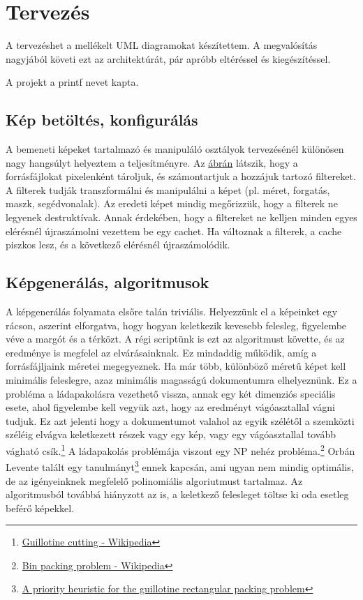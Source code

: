 \chapter{Tervezés}

A tervezéshet a mellékelt UML diagramokat készítettem. A megvalósítás nagyjából követi ezt az architektúrát, pár apróbb eltéréssel és kiegészítéssel.

A projekt a printf nevet kapta.

\section{Kép betöltés, konfigurálás}

A bemeneti képeket tartalmazó és manipuláló osztályok tervezésénél különösen nagy hangsúlyt helyeztem a teljesítményre. Az \href{fig:ImageSource_uml}{ábrán} látszik, hogy a forrásfájlokat pixelenként tároljuk, és számontartjuk a hozzájuk tartozó filtereket. A filterek tudják transzformálni és manipulálni a képet (pl. méret, forgatás, maszk, segédvonalak). Az eredeti képet mindig megőrizzük, hogy a filterek ne legyenek destruktívak. Annak érdekében, hogy a filtereket ne kelljen minden egyes elérésnél újraszámolni vezettem be egy cachet. Ha változnak a filterek, a cache piszkos lesz, és a következő elérésnél újraszámolódik.

\section{Képgenerálás, algoritmusok}

A képgenerálás folyamata elsőre talán triviális. Helyezzünk el a képeinket egy rácson, aszerint elforgatva, hogy hogyan keletkezik kevesebb felesleg, figyelembe véve a margót és a térközt. A régi scriptünk is ezt az algoritmust követte, és az eredménye is megfelel az elvárásainknak. Ez mindaddig működik, amíg a forrásfájljaink méretei megegyeznek. Ha már több, különböző méretű képet kell minimális feleslegre, azaz minimális magasságú dokumentumra elhelyeznünk. Ez a probléma a ládapakolásra vezethető vissza, annak egy két dimenziós speciális esete, ahol figyelembe kell vegyük azt, hogy az eredményt vágóasztallal vágni tudjuk. Ez azt jelenti hogy a dokumentumot valahol az egyik szélétől a szemközti széléig elvágva keletkezett részek vagy egy kép, vagy egy vágóasztallal tovább vágható csík.\footnote{\href{https://en.wikipedia.org/wiki/Guillotine_cutting}{Guillotine cutting - Wikipedia}} A ládapakolás problémája viszont egy NP nehéz probléma.\footnote{\href{https://en.wikipedia.org/wiki/Bin_packing_problem}{Bin packing problem - Wikipedia}} Orbán Levente talált egy tanulmányt\footnote{\href{https://sci-hub.se/10.1016/j.ipl.2015.08.008}{A priority heuristic for the guillotine rectangular packing problem}} ennek kapcsán, ami ugyan nem mindig optimális, de az igényeinknek megfelelő polinomiális algoriutmust tartalmaz. Az algoritmusból továbbá hiányzott az is, a keletkező felesleget töltse ki oda esetleg beférő képekkel.

